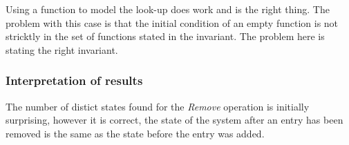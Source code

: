 \documentclass[12pt]{article}
\begin{document}
\begin{infobox}{\tricky}
Using a function to model the look-up does work and is the right thing.
The problem with this case is that the initial condition of an empty function
is not stricktly in the set of functions stated in the invariant.
The problem here is stating the right invariant.
\end{infobox}

\subsubsection{Interpretation of results}
The number of distict states found for the \textit{Remove} operation is
initially surprising, however it is correct, the state of the system after an
entry has been removed is the same as the state before the entry was added.
\end{document}
